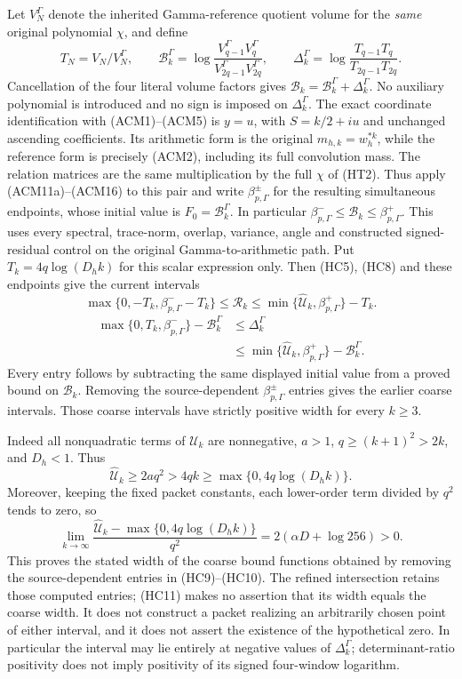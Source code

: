 Let $V_N^\Gamma$ denote the inherited Gamma-reference quotient volume
for the \emph{same} original polynomial $\chi$, and define
\[
 T_N=V_N/V_N^\Gamma,\qquad
 \mathcal B_k^\Gamma=\log\frac{V_{q-1}^\Gamma V_q^\Gamma}
 {V_{2q-1}^\Gamma V_{2q}^\Gamma},\qquad
 \Delta_k^\Gamma=\log\frac{T_{q-1}T_q}{T_{2q-1}T_{2q}}.
\]
Cancellation of the four literal volume factors gives
$\mathcal B_k=\mathcal B_k^\Gamma+\Delta_k^\Gamma$.
No auxiliary polynomial is introduced and no sign is imposed on
$\Delta_k^\Gamma$. The exact coordinate identification with (ACM1)--(ACM5)
is $y=u$, with $S=k/2+iu$ and unchanged ascending coefficients.
Its arithmetic form is the original $m_{h,k}=w_h^{*k}$, while the
reference form is precisely (ACM2), including its full convolution
mass. The relation matrices are the same multiplication by the full
$\chi$ of (HT2). Thus apply (ACM11a)--(ACM16) to this pair and write
$\beta_{p,\Gamma}^\pm$ for the resulting simultaneous endpoints,
whose initial value is $F_0=\mathcal B_k^\Gamma$. In particular
$\beta_{p,\Gamma}^-\leq\mathcal B_k\leq\beta_{p,\Gamma}^+$.
This uses every spectral, trace-norm, overlap, variance, angle and
constructed signed-residual control on the original Gamma-to-arithmetic
path. Put $T_k=4q\log(D_hk)$ for this scalar expression only. Then
(HC5), (HC8) and these endpoints give the current intervals
\[
 \boxed{
 \max\{0,-T_k,\beta_{p,\Gamma}^--T_k\}\leq\mathcal R_k
 \leq\min\{\widehat{\mathcal U}_k,\beta_{p,\Gamma}^+\}-T_k.}
 \tag{HC9}
\]
\[
\begin{split}
 \max\{0,T_k,\beta_{p,\Gamma}^-\}-\mathcal B_k^\Gamma
 &\leq\Delta_k^\Gamma\\
 &\leq\min\{\widehat{\mathcal U}_k,\beta_{p,\Gamma}^+\}
                          -\mathcal B_k^\Gamma.
\end{split}
\tag{HC10}
\]
Every entry follows by subtracting the same displayed initial value
from a proved bound on $\mathcal B_k$. Removing the source-dependent
$\beta_{p,\Gamma}^\pm$ entries gives the earlier coarse intervals.
Those coarse intervals have strictly positive width for every $k\geq3$.

Indeed all nonquadratic terms of $\mathcal U_k$ are nonnegative,
$a>1$, $q\geq(k+1)^2>2k$, and $D_h<1$.  Thus
\[
 \widehat{\mathcal U}_k\geq2a q^2
 >4qk\geq\max\{0,4q\log(D_hk)\}.
\]
Moreover, keeping the fixed packet constants, each lower-order term
divided by $q^2$ tends to zero, so
\[
 \lim_{k\to\infty}
 \frac{\widehat{\mathcal U}_k-\max\{0,4q\log(D_hk)\}}{q^2}
 =2(\alpha D+\log256)>0.\tag{HC11}
\]
This proves the stated width of the coarse bound functions obtained
by removing the source-dependent entries in (HC9)--(HC10). The
refined intersection retains those computed entries; (HC11) makes
no assertion that its width equals the coarse width.  It does not construct a packet realizing an arbitrarily
chosen point of either interval, and it does not assert the existence
of the hypothetical zero.  In particular the interval may lie entirely
at negative values of $\Delta_k^\Gamma$; determinant-ratio positivity
does not imply positivity of its signed four-window logarithm.


